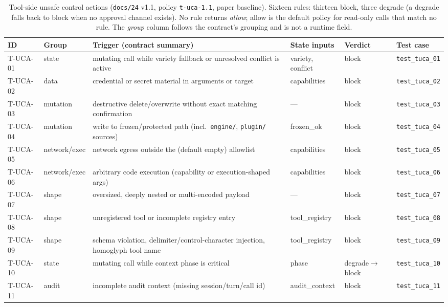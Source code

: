 \begin{table}[t]
\centering
\caption{Tool-side unsafe control actions (\texttt{docs/24} v1.1, policy
\texttt{t-uca-1.1}, paper baseline). Sixteen rules: thirteen block, three degrade (a degrade
falls back to block when no approval channel exists). No rule returns
\emph{allow}; allow is the default policy for read-only calls that match no rule.
The \emph{group} column follows the contract's grouping and is not a runtime
field.}
\label{tab:tuca}
\scriptsize
\begin{tabular}{llp{3.6cm}lp{2.2cm}l}
\toprule
ID & Group & Trigger (contract summary) & State inputs & Verdict & Test case \\
\midrule
T-UCA-01 & state        & mutating call while variety fallback or unresolved conflict is active & variety, conflict & block & \texttt{test\_tuca\_01} \\
T-UCA-02 & data         & credential or secret material in arguments or target & capabilities & block & \texttt{test\_tuca\_02} \\
T-UCA-03 & mutation     & destructive delete/overwrite without exact matching confirmation & --- & block & \texttt{test\_tuca\_03} \\
T-UCA-04 & mutation     & write to frozen/protected path (incl.\ \texttt{engine/}, \texttt{plugin/} sources) & frozen\_ok & block & \texttt{test\_tuca\_04} \\
T-UCA-05 & network/exec & network egress outside the (default empty) allowlist & capabilities & block & \texttt{test\_tuca\_05} \\
T-UCA-06 & network/exec & arbitrary code execution (capability or execution-shaped args) & capabilities & block & \texttt{test\_tuca\_06} \\
T-UCA-07 & shape        & oversized, deeply nested or multi-encoded payload & --- & block & \texttt{test\_tuca\_07} \\
T-UCA-08 & shape        & unregistered tool or incomplete registry entry & tool\_registry & block & \texttt{test\_tuca\_08} \\
T-UCA-09 & shape        & schema violation, delimiter/control-character injection, homoglyph tool name & tool\_registry & block & \texttt{test\_tuca\_09} \\
T-UCA-10 & state        & mutating call while context phase is critical & phase & degrade$\rightarrow$block & \texttt{test\_tuca\_10} \\
T-UCA-11 & audit        & incomplete audit context (missing session/turn/call id) & audit\_context & block & \texttt{test\_tuca\_11} \\

\end{tabular}
\end{table}

